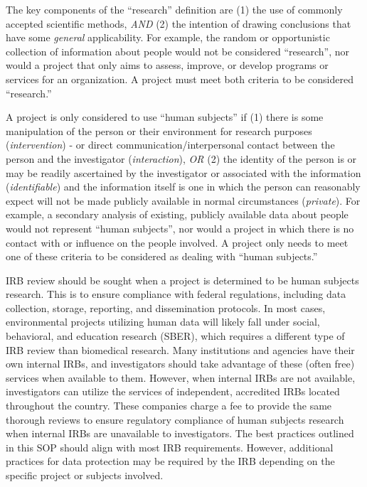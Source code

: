 \documentclass[
]{book}
\begin{document}
The key components of the ``research'' definition are (1) the use of commonly accepted scientific methods, \emph{AND} (2) the intention of drawing conclusions that have some \emph{general} applicability. For example, the random or opportunistic collection of information about people would not be considered ``research'', nor would a project that only aims to assess, improve, or develop programs or services for an organization. A project must meet both criteria to be considered ``research.''

A project is only considered to use ``human subjects'' if (1) there is some manipulation of the person or their environment for research purposes (\emph{intervention}) - or direct communication/interpersonal contact between the person and the investigator (\emph{interaction}), \emph{OR} (2) the identity of the person is or may be readily ascertained by the investigator or associated with the information (\emph{identifiable}) and the information itself is one in which the person can reasonably expect will not be made publicly available in normal circumstances (\emph{private}). For example, a secondary analysis of existing, publicly available data about people would not represent ``human subjects'', nor would a project in which there is no contact with or influence on the people involved. A project only needs to meet one of these criteria to be considered as dealing with ``human subjects.''

IRB review should be sought when a project is determined to be human subjects research. This is to ensure compliance with federal regulations, including data collection, storage, reporting, and dissemination protocols. In most cases, environmental projects utilizing human data will likely fall under social, behavioral, and education research (SBER), which requires a different type of IRB review than biomedical research. Many institutions and agencies have their own internal IRBs, and investigators should take advantage of these (often free) services when available to them. However, when internal IRBs are not available, investigators can utilize the services of independent, accredited IRBs located throughout the country. These companies charge a fee to provide the same thorough reviews to ensure regulatory compliance of human subjects research when internal IRBs are unavailable to investigators. The best practices outlined in this SOP should align with most IRB requirements. However, additional practices for data protection may be required by the IRB depending on the specific project or subjects involved.
\end{document}
